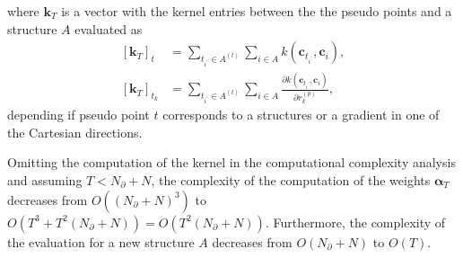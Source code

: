 where $\mathbf{k}_{T}$ is a vector with the kernel entries between the the pseudo points and a structure $A$ evaluated as
\begin{subequations}
  \begin{align}
    [\mathbf{k}_{T}]_{t} &= 
      \sum_{t_{i^\prime}\in A^{(t)}}\sum_{i\in A} k(\mathbf{c}_{t_{i^\prime}}, \mathbf{c}_{i}), \\
    [\mathbf{k}_{T}]_{t_k} &= 
      \sum_{t_{i^\prime}\in A^{(t)}}\sum_{i\in A} \frac{\partial k(\mathbf{c}_{t_{i^\prime}}, \mathbf{c}_{i})}{\partial r_k^{(p)}},
  \end{align}
\end{subequations}
depending if pseudo point $t$ corresponds to a structures or a gradient in one of the Cartesian directions.

Omitting the computation of the kernel in the computational complexity analysis and assuming $T < N_{\partial} + N$, 
the complexity of the computation of the weights $\boldsymbol{\alpha}_T$ decreases from $O((N_{\partial} + N)^3)$ to $O(T^3 + T^2(N_{\partial} + N)) = O(T^2(N_{\partial} + N))$.
Furthermore, the complexity of the evaluation for a new structure $A$ decreases from $O(N_{\partial}+N)$ to $O(T)$.

